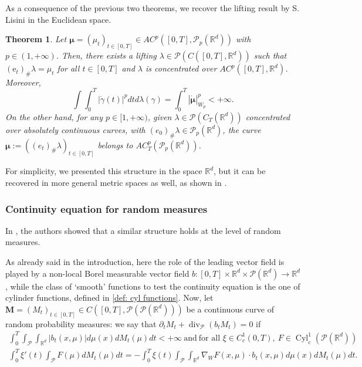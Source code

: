 \documentclass[10pt,leqno]{amsart}
\numberwithin{equation}{section}
\newtheorem{teorema}{Theorem}[section]
\newcommand{\R}{\mathbb{R}}
\newcommand{\PP}{\mathcal{P}}
\newcommand{\e}{\mathrm{e}}
\begin{document}
As a consequence of the previous two theorems, we recover the lifting result by S. Lisini \cite{lisini2007characterization} in the Euclidean space.

\begin{teorema}
     Let $\boldsymbol{\mu}=(\mu_t)_{t\in [0,T]} \in AC^p([0,T],\PP_p(\R^d))$ with $p\in(1,+\infty)$. Then, there exists a lifting $\lambda\in \PP(C([0,T],\R^d))$ such that  $(\e_t)_{\#}\lambda = \mu_t$ for all $t\in [0,T]$ and $\lambda$ is concentrated over $AC^p([0,T],\R^d)$. Moreover,
        \begin{equation}\label{minimal lifting}
            \int \int_0^T |\dot\gamma(t)|^p dt d\lambda (\gamma) = \int_0^T |\dot{\boldsymbol{\mu}}|^p_{W_p} < +\infty.
        \end{equation}
    On the other hand, for any $p\in [1,+\infty)$, given $\lambda\in \PP(C_T(\R^d))$ concentrated over absolutely continuous curves, with $(e_0)_\#\lambda\in \PP_p(\R^d)$, the curve $\boldsymbol{\mu}:= ((e_t)_\#\lambda)_{t\in [0,T]}$ belongs to $AC^p_T(\PP_p(\R^d))$.
\end{teorema}

For simplicity, we presented this structure in the space $\R^d$, but it can be recovered in more general metric spaces as well, as shown in \cite{stepanov2017three}.

\subsubsection{Continuity equation for random measures} In \cite{pinzisavare2025}, the authors showed that a similar structure holds at the level of random measures. 



As already said in the introduction, here the role of the leading vector field is played by a non-local Borel measurable vector field $b:[0,T]\times \R^d \times \PP(\R^d) \to \R^d$, while the class of `smooth' functions to test the continuity equation is the one of cylinder functions, defined in \ref{def: cyl functions}. Now, let $\boldsymbol{M} = (M_t)_{t\in[0,T]}\in C([0,T],\PP(\PP(\R^d)))$ be a continuous curve of random probability measures: we say that $\partial_t M_t + \operatorname{div}_\PP(b_tM_t) = 0$ if 
\begin{equation}\label{eq: CERM}
    \begin{aligned}
        \int_0^T \int_{\PP}\int_{\R^d} |b_t(x,\mu)|d\mu(x) dM_t(\mu) dt <+\infty \  \text{and} \  \text{for all }\xi\in C_c^1(0,T), \ F \in \operatorname{Cyl}_c^1(\PP(\R^d))
        \\
        \int_0^T \xi'(t) \int_{\PP} F(\mu) dM_t(\mu) dt = - \int_0^T \xi(t) \int_{\PP}\int_{\R^d} \nabla_W F(x,\mu) \cdot b_t(x,\mu) d\mu(x) dM_t(\mu) dt.
    \end{aligned}   
\end{equation}
    
\end{document}
